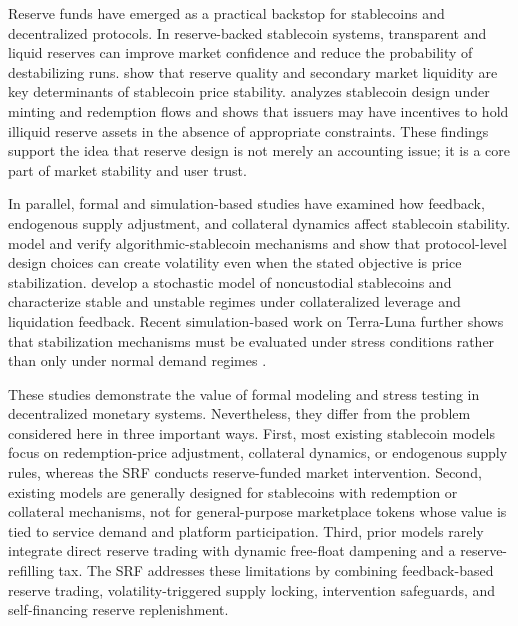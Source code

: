 \documentclass[a4paper,fleqn]{cas-dc}
\begin{document}
Reserve funds have emerged as a practical backstop for stablecoins and decentralized protocols. In reserve-backed stablecoin systems, transparent and liquid reserves can improve market confidence and reduce the probability of destabilizing runs. \citet{lyons2023stablecoins} show that reserve quality and secondary market liquidity are key determinants of stablecoin price stability. \citet{bertsch2026runs} analyzes stablecoin design under minting and redemption flows and shows that issuers may have incentives to hold illiquid reserve assets in the absence of appropriate constraints. These findings support the idea that reserve design is not merely an accounting issue; it is a core part of market stability and user trust.

In parallel, formal and simulation-based studies have examined how feedback, endogenous supply adjustment, and collateral dynamics affect stablecoin stability. \citet{zhao2021volatility} model and verify algorithmic-stablecoin mechanisms and show that protocol-level design choices can create volatility even when the stated objective is price stabilization. \citet{klages2022while} develop a stochastic model of noncustodial stablecoins and characterize stable and unstable regimes under collateralized leverage and liquidation feedback. Recent simulation-based work on Terra-Luna further shows that stabilization mechanisms must be evaluated under stress conditions rather than only under normal demand regimes \citep{calandra2025terra}.

These studies demonstrate the value of formal modeling and stress testing in decentralized monetary systems. Nevertheless, they differ from the problem considered here in three important ways. First, most existing stablecoin models focus on redemption-price adjustment, collateral dynamics, or endogenous supply rules, whereas the SRF conducts reserve-funded market intervention. Second, existing models are generally designed for stablecoins with redemption or collateral mechanisms, not for general-purpose marketplace tokens whose value is tied to service demand and platform participation. Third, prior models rarely integrate direct reserve trading with dynamic free-float dampening and a reserve-refilling tax. The SRF addresses these limitations by combining feedback-based reserve trading, volatility-triggered supply locking, intervention safeguards, and self-financing reserve replenishment.
\end{document}
